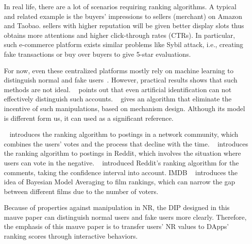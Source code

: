 In real life, there are a lot of scenarios requiring ranking algorithms. A typical and related example is the buyers' impressions to sellers (merchant) on Amazon and Taobao. sellers with higher reputation will be given better display slots thus obtains more attentions and higher click-through rates (CTRs). In particular, such e-commerce platform exists similar problems like Sybil attack, i.e., creating fake transactions or buy over buyers to give 5-star evaluations. 

For now, even these centralized platforms mostly rely on machine learning to distinguish normal and fake users~\cite{mukherjee2013spotting,jindal2008opinion,yoo2009comparison}. However, practical results shows that such methods are not ideal. ~\cite{ott2011finding} points out that even artificial identification can not effectively distinguish such accounts. ~\cite{cai2016mechanism} gives an algorithm that eliminate the incentive of such manipulations, based on mechanism design. Although its model is different form us, it can used as a significant reference.

~\cite{salihefendic2010hacker} introduces the ranking algorithm to postings in a network community, which combines the users' votes and the process that decline with the time. ~\cite{salihefendic2010reddit} introduces the ranking algorithm to postings in Reddit, which involves the situation where users can vote in the negative. 
~\cite{miller2009how} introduced Reddit's ranking algorithm for the comments, taking the confidence interval into account.
IMDB ~\cite {IMDB} introduces the idea of Bayesian Model Averaging to film rankings, which can narrow the gap between different films due to the number of voters.

Because of properties against manipulation in NR, the DIP designed in this mauve paper can distinguish normal users and fake users more clearly. Therefore, the emphasis of this mauve paper is to transfer users' NR values to DApps' ranking scores through interactive behaviors.


